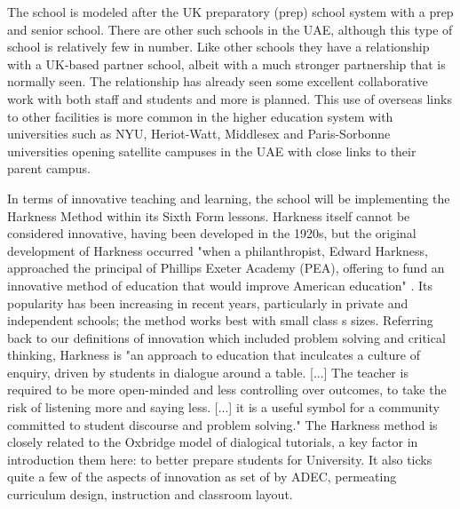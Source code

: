 The school is modeled after the UK preparatory (prep) school system with a prep and senior school. There are other such schools in the UAE, although this type of school is relatively few in number. Like other schools they have a relationship with a UK-based partner school, albeit with a much stronger partnership that is normally seen. The relationship has already seen some excellent collaborative work with both staff and students and  more is planned. This use of overseas links to other facilities is more common in the higher education system with universities such as NYU, Heriot-Watt, Middlesex and Paris-Sorbonne universities opening satellite campuses in the UAE with close links to their parent campus.

In terms of innovative teaching and learning, the school will be implementing the Harkness Method within its Sixth Form lessons. Harkness itself cannot be considered innovative, having been developed in the 1920s, but the original development of Harkness occurred "when a philanthropist, Edward Harkness, approached the principal of Phillips Exeter Academy (PEA), offering to fund an innovative method of education that would improve American education" \cite[p. 182]{Sevigny2016}. Its popularity has been increasing in recent years, particularly in private and independent schools; the method works best with small class s sizes. Referring back to our definitions of innovation which included problem solving and critical thinking, Harkness is "an approach to education that inculcates a culture of enquiry, driven by students in dialogue around a table. [...] The teacher is required to be more open-minded and less controlling over outcomes, to take the risk of listening more and saying less. [...] it is a useful symbol for a community committed to student discourse and problem solving." \cite{Williams2010} The Harkness method is closely related to the Oxbridge model of dialogical tutorials, a key factor in introduction them here: to better prepare students for University. It also ticks quite a few of the aspects of innovation as set of by ADEC, permeating curriculum design, instruction and classroom layout. 


